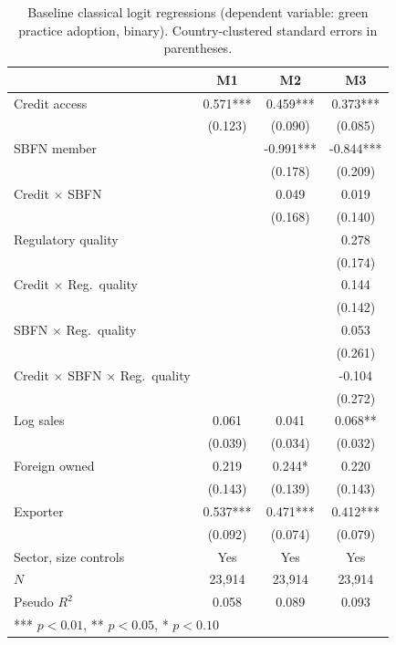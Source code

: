 \documentclass[review,authoryear,12pt]{elsarticle}
\begin{document}


\begin{table}[htbp]
\centering
\caption{Baseline classical logit regressions (dependent variable: green practice adoption, binary). Country-clustered standard errors in parentheses.}
\label{tab:baseline}
\begin{footnotesize}
\begin{tabular}{lccc}
\toprule
 & M1 & M2 & M3 \\
\midrule
Credit access & 0.571*** & 0.459*** & 0.373*** \\
 & (0.123) & (0.090) & (0.085) \\
SBFN member & & -0.991*** & -0.844*** \\
 & & (0.178) & (0.209) \\
Credit $\times$ SBFN & & 0.049 & 0.019 \\
 & & (0.168) & (0.140) \\
Regulatory quality & & & 0.278 \\
 & & & (0.174) \\
Credit $\times$ Reg.\ quality & & & 0.144 \\
 & & & (0.142) \\
SBFN $\times$ Reg.\ quality & & & 0.053 \\
 & & & (0.261) \\
Credit $\times$ SBFN $\times$ Reg.\ quality & & & -0.104 \\
 & & & (0.272) \\
Log sales & 0.061 & 0.041 & 0.068** \\
 & (0.039) & (0.034) & (0.032) \\
Foreign owned & 0.219 & 0.244* & 0.220 \\
 & (0.143) & (0.139) & (0.143) \\
Exporter & 0.537*** & 0.471*** & 0.412*** \\
 & (0.092) & (0.074) & (0.079) \\
Sector, size controls & Yes & Yes & Yes \\
\midrule
$N$ & 23{,}914 & 23{,}914 & 23{,}914 \\
Pseudo $R^2$ & 0.058 & 0.089 & 0.093 \\
\bottomrule
\multicolumn{4}{l}{*** $p<0.01$, ** $p<0.05$, * $p<0.10$}
\end{tabular}
\end{footnotesize}
\end{table}
\end{document}

